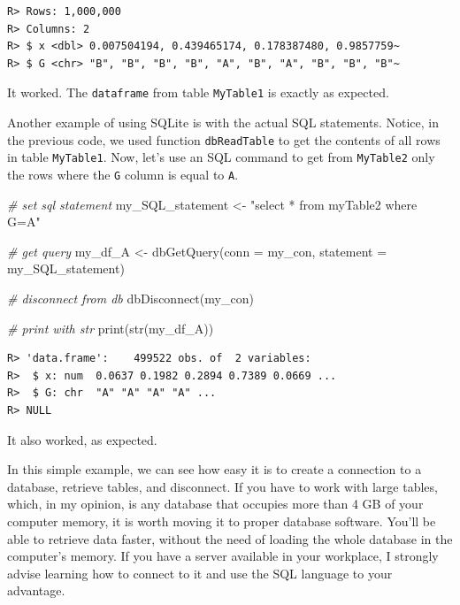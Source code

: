 \documentclass[
  12pt,
]{book}
\newenvironment{Shaded}{\begin{snugshade}}{\end{snugshade}}
\newcommand{\AttributeTok}[1]{\textcolor[rgb]{0.61,0.61,0.61}{#1}}
\newcommand{\CommentTok}[1]{\textcolor[rgb]{0.37,0.37,0.37}{\textit{#1}}}
\newcommand{\FunctionTok}[1]{\textcolor[rgb]{0,0,0}{#1}}
\newcommand{\NormalTok}[1]{#1}
\newcommand{\OtherTok}[1]{\textcolor[rgb]{0.37,0.37,0.37}{#1}}
\newcommand{\StringTok}[1]{\textcolor[rgb]{0.5,0.5,0.5}{#1}}
\begin{document}
\begin{verbatim}
R> Rows: 1,000,000
R> Columns: 2
R> $ x <dbl> 0.007504194, 0.439465174, 0.178387480, 0.9857759~
R> $ G <chr> "B", "B", "B", "B", "A", "B", "A", "B", "B", "B"~
\end{verbatim}

It worked. The \texttt{dataframe} from table \texttt{MyTable1} is exactly as expected. 

Another example of using SQLite is with the actual SQL statements. Notice, in the previous code, we used function \texttt{dbReadTable} to get the contents of all rows in table \texttt{MyTable1}. Now, let's use an SQL command to get from \texttt{MyTable2} only the rows where the \texttt{G} column is equal to \texttt{A}.

\begin{Shaded}
\begin{Highlighting}[]
\CommentTok{\# set sql statement}
\NormalTok{my\_SQL\_statement }\OtherTok{\textless{}{-}} \StringTok{"select * from myTable2 where G=\textquotesingle{}A\textquotesingle{}"}

\CommentTok{\# get query}
\NormalTok{my\_df\_A }\OtherTok{\textless{}{-}} \FunctionTok{dbGetQuery}\NormalTok{(}\AttributeTok{conn =}\NormalTok{ my\_con, }
                      \AttributeTok{statement =}\NormalTok{ my\_SQL\_statement)}

\CommentTok{\# disconnect from db}
\FunctionTok{dbDisconnect}\NormalTok{(my\_con)}

\CommentTok{\# print with str}
\FunctionTok{print}\NormalTok{(}\FunctionTok{str}\NormalTok{(my\_df\_A))}
\end{Highlighting}
\end{Shaded}

\begin{verbatim}
R> 'data.frame':    499522 obs. of  2 variables:
R>  $ x: num  0.0637 0.1982 0.2894 0.7389 0.0669 ...
R>  $ G: chr  "A" "A" "A" "A" ...
R> NULL
\end{verbatim}

It also worked, as expected.

In this simple example, we can see how easy it is to create a connection to a database, retrieve tables, and disconnect. If you have to work with large tables, which, in my opinion, is any database that occupies more than 4 GB of your computer memory, it is worth moving it to proper database software. You'll be able to retrieve data faster, without the need of loading the whole database in the computer's memory. If you have a server available in your workplace, I strongly advise learning how to connect to it and use the SQL language to your advantage.
\end{document}
